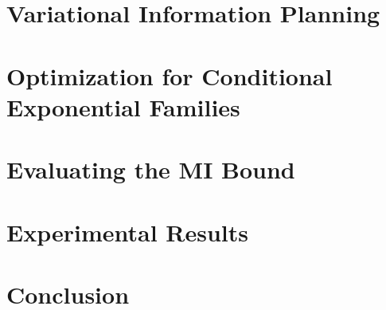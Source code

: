 \documentclass[twoside]{article}
\begin{document}
\section{Variational Information Planning}\label{sec:varplan}


\section{Optimization for Conditional Exponential Families}\label{sec:optim}


\section{Evaluating the MI Bound}


\section{Experimental Results}\label{sec:experiments}


\section{Conclusion}




\end{document}
